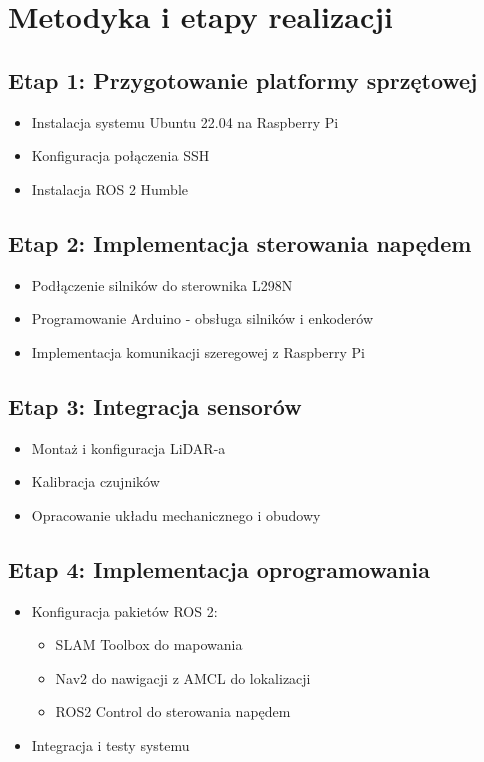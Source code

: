 \documentclass[a4paper,twoside,12pt]{book}
\begin{document}
\section{Metodyka i etapy realizacji}
\subsection{Etap 1: Przygotowanie platformy sprzętowej}
\begin{itemize}
\item Instalacja systemu Ubuntu 22.04 na Raspberry Pi
\item Konfiguracja połączenia SSH
\item Instalacja ROS 2 Humble
\end{itemize}

\subsection{Etap 2: Implementacja sterowania napędem}
\begin{itemize}
\item Podłączenie silników do sterownika L298N
\item Programowanie Arduino - obsługa silników i enkoderów
\item Implementacja komunikacji szeregowej z Raspberry Pi
\end{itemize}

\subsection{Etap 3: Integracja sensorów}
\begin{itemize}
\item Montaż i konfiguracja LiDAR-a
\item Kalibracja czujników
\item Opracowanie układu mechanicznego i obudowy
\end{itemize}

\subsection{Etap 4: Implementacja oprogramowania}
\begin{itemize}
\item Konfiguracja pakietów ROS 2:
	\begin{itemize}
	\item SLAM Toolbox do mapowania
	\item Nav2 do nawigacji z AMCL do lokalizacji
	\item ROS2 Control do sterowania napędem
	\end{itemize}
\item Integracja i testy systemu
\end{itemize}
\end{document}
